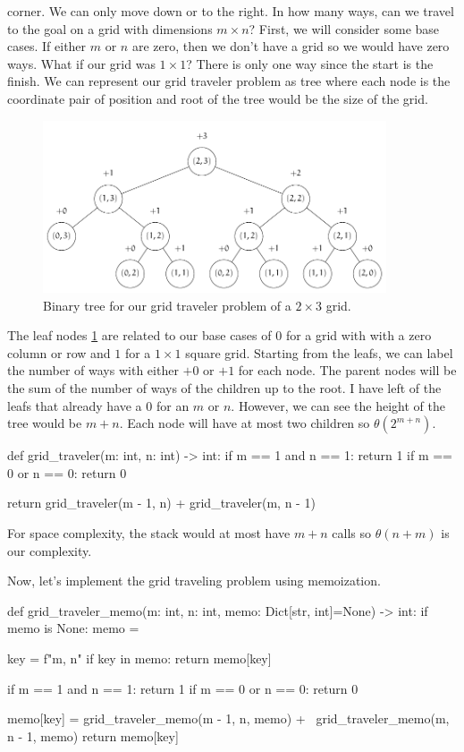\documentclass[12pt,dvipsnames,svgnames,x11names]{article}
\begin{document}
corner. We can only move down or to the right. In how many ways, can we travel to the goal on a 
grid with dimensions \(m\times n\)? First, we will consider some base cases. If either \(m\) or \(n\) are 
zero, then we don't have a grid so we would have zero ways. What if our grid was \(1\times 1\)? There
is only one way since the start is the finish. We can represent our grid traveler problem as tree where
each node is the coordinate pair of position and root of the tree would be the size of the grid.
\begin{figure}[h]
	\centering
	\includegraphics[width=4in]{grid_traveler.pdf}
	\caption{Binary tree for our grid traveler problem of a \(2\times 3\) grid.}
	\label{fig:grid_travel}
\end{figure}
The leaf nodes \cref{fig:grid_travel} are related to our base cases of \(0\) for a grid with with a zero 
column or row and \(1\) for a \(1\times 1\) square grid. Starting from the leafs, we can label the number
of ways with either \(+0\) or \(+1\) for each node. The parent nodes will be the sum of the number of 
ways of the children up to the root.  I have left of the leafs that already have a \(0\) for an \(m\) or \(n\).
However, we can see the height of the tree would be \(m + n\). Each node will have at most two children
so \(\theta (2^{m + n})\).
\begin{python}
def grid_traveler(m: int, n: int) -> int:
  if m == 1 and n == 1:
    return 1
  if m == 0 or n == 0:
    return 0
    
  return grid_traveler(m - 1, n) + grid_traveler(m, n - 1)
\end{python}
For space complexity, the stack would at most have \(m + n\) calls so \(\theta(n + m)\) is our complexity.
\par\medskip
Now, let's implement the grid traveling problem using memoization.
\begin{python}
def grid_traveler_memo(m: int, n: int, memo: Dict[str, int]=None) -> int:
  if memo is None:
    memo = {}
  
  key = f"{m}, {n}"
  if key in memo:
    return memo[key]
    
  if m == 1 and n == 1:
    return 1
  if m == 0 or n == 0:
    return 0
    
  memo[key] = grid_traveler_memo(m - 1, n, memo) + \ 
    grid_traveler_memo(m, n - 1, memo)
  return memo[key]
\end{python}
\end{document}
